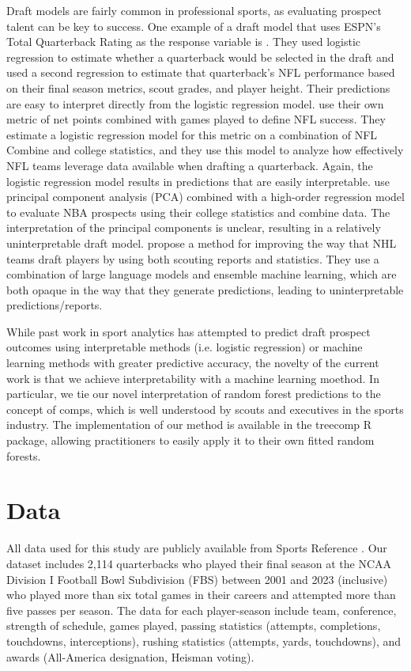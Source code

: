 \documentclass{article}
\begin{document}
Draft models are fairly common in professional sports, as evaluating prospect talent can be key to success. One example of a draft model that uses ESPN's Total Quarterback Rating as the response variable is \citet{craig_predicting_2021}. They used logistic regression to estimate whether a quarterback would be selected in the draft and used a second regression to estimate that quarterback's NFL performance based on their final season metrics, scout grades, and player height. Their predictions are easy to interpret directly from the logistic regression model. \citet{wolfson_quarterback_2011} use their own metric of net points combined with games played to define NFL success. They estimate a logistic regression model for this metric on a combination of NFL Combine and college statistics, and they use this model to analyze how effectively NFL teams leverage data available when drafting a quarterback. Again, the logistic regression model results in predictions that are easily interpretable. \citet{berger_jumping_2021} use principal component analysis (PCA) combined with a high-order regression model to evaluate NBA prospects using their college statistics and combine data. The interpretation of the principal components is unclear, resulting in a relatively uninterpretable draft model. \citet{luo_improving_2024} propose a method for improving the way that NHL teams draft players by using both scouting reports and statistics. They use a combination of large language models and ensemble machine learning, which are both opaque in the way that they generate predictions, leading to uninterpretable predictions/reports.

While past work in sport analytics has attempted to predict draft prospect outcomes using interpretable methods (i.e. logistic regression) or machine learning methods with greater predictive accuracy, the novelty of the current work is that we achieve interpretability with a machine learning moethod. In particular, we tie our novel interpretation of random forest predictions to the concept of comps, which is well understood by scouts and executives in the sports industry. The implementation of our method is available in the treecomp R package, allowing practitioners to easily apply it to their own fitted random forests.

\section{Data}
\label{sec:data}

All data used for this study are publicly available from Sports Reference \citep{sports_reference_sports_2025}. Our dataset includes 2,114 quarterbacks who played their final season at the NCAA Division I Football Bowl Subdivision (FBS) between 2001 and 2023 (inclusive) who played more than six total games in their careers and attempted more than five passes per season. The data for each player-season include team, conference, strength of schedule, games played, passing statistics (attempts, completions, touchdowns, interceptions), rushing statistics (attempts, yards, touchdowns), and awards (All-America designation, Heisman voting).
\end{document}
